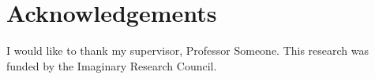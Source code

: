 \chapter{Acknowledgements}

I would like to thank my supervisor, Professor Someone. This
research was funded by the Imaginary Research Council.
